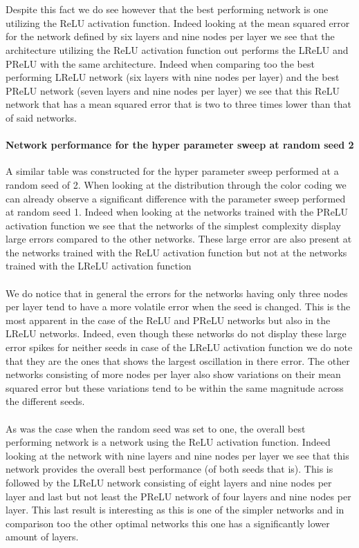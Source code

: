 \documentclass[]{article}
\begin{document}
\\
\\
Despite this fact we do see however that the best performing network is one utilizing the ReLU activation function. Indeed looking at the mean squared error for the network defined by six layers and nine nodes per layer we see that the architecture utilizing the ReLU activation function out performs the LReLU and PReLU with the same architecture. Indeed when comparing too the best performing LReLU network (six layers with nine nodes per layer) and the best PReLU network (seven layers and nine nodes per layer) we see that this ReLU network that has a mean squared error that is two to three times lower than that of said networks.

\paragraph{Network performance for the hyper parameter sweep at random seed 2}

A similar table was constructed for the hyper parameter sweep performed at a random seed of 2. When looking at the distribution through the color coding we can already observe a significant difference with the parameter sweep performed at random seed 1. Indeed when looking at the networks trained with the PReLU activation function we see that the networks of the simplest complexity display large errors compared to the other networks. These large error are also present at the networks trained with the ReLU activation function but not at the networks trained with the LReLU activation function
\\
\\
We do notice that in general the errors for the networks having only three nodes per layer tend to have a more volatile error when the seed is changed. This is the most apparent in the case of the ReLU and PReLU networks but also in the LReLU networks. Indeed, even though these networks do not display these large error spikes for neither seeds in case of the LReLU activation function we do note that they are the ones that shows the largest oscillation in there error. The other networks consisting of more nodes per layer also show variations on their mean squared error but these variations tend to be within the same magnitude across the different seeds.
\\
\\
As was the case when the random seed was set to one, the overall best performing network is a network using the ReLU activation function. Indeed looking at the network with nine layers and nine nodes per layer we see that this network provides the overall best performance (of both seeds that is). This is followed by the LReLU network consisting of eight layers and nine nodes per layer and last but not least the PReLU network of four layers and nine nodes per layer. This last result is interesting as this is one of the simpler networks and in comparison too the other optimal networks this one has a significantly lower amount of layers.
\end{document}
